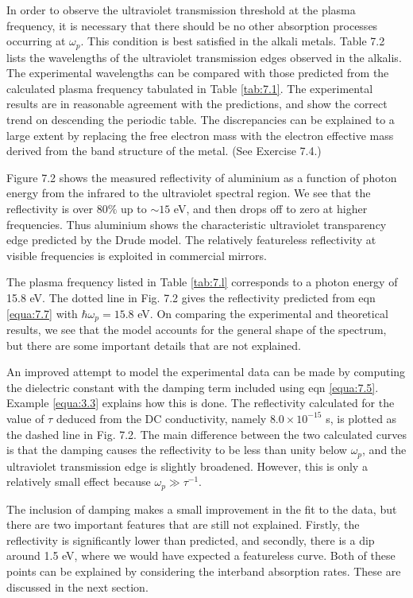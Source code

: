 \documentclass[12pt]{book}
\begin{document}
{In order to observe the ultraviolet transmission threshold at  the plasma frequency, it is necessary that there should be no other absorption processes occurring at $\omega_p$. This condition is best satisfied in the alkali metals. Table 7.2 lists the wavelengths of the ultraviolet transmission edges observed in the alkalis. The experimental wavelengths can be compared with those predicted from the calculated plasma frequency tabulated in Table \ref{tab:7.1}. The experimental results are in reasonable agreement with the predictions, and show the correct trend on descending the periodic table. The discrepancies can be explained to a large extent by replacing the free electron mass with the electron effective mass derived from the band structure of the metal. (See Exercise 7.4.)

Figure 7.2 shows the measured reflectivity of aluminium as a function of photon energy from the infrared to the ultraviolet spectral region. We see that the reflectivity is over $80\%$ up to $\sim15$ eV, and then drops off to zero at higher frequencies. Thus aluminium shows the characteristic ultraviolet transparency edge predicted by the Drude model. The relatively featureless reflectivity at visible frequencies is exploited in commercial mirrors.

The plasma frequency listed in Table \ref{tab:7.l} corresponds to a photon energy of 15.8 eV. The dotted line in Fig. 7.2 gives the reflectivity predicted from eqn \ref{equa:7.7} with $\hbar\omega_p = 15.8$ eV. On comparing the experimental and theoretical results, we see that the model accounts for the general shape of the spectrum, but there are some important details that are not explained.

An improved attempt to model the experimental data can be made by computing the dielectric constant with the damping term included using eqn \ref{equa:7.5}. Example \ref{equa:3.3} explains how this is done. The reflectivity calculated for the value of $\tau$ deduced from the DC conductivity, namely $8.0 \times10^{-15}$ s, is plotted as the dashed line in Fig. 7.2. The main difference between the two calculated curves is that the damping causes the reflectivity to be less than unity below $\omega_p$, and the ultraviolet transmission edge is slightly broadened. However, this is only a relatively small effect because $\omega_p\gg\tau^{-1}$.

The inclusion of damping makes a small improvement in the fit to the data, but there are two important features that are still not explained. Firstly, the reflectivity is significantly lower than predicted, and secondly, there is a dip around 1.5 eV, where we would have expected a featureless curve. Both of these points can be explained by considering the interband absorption rates. These are discussed in the next section.

}
\end{document}

